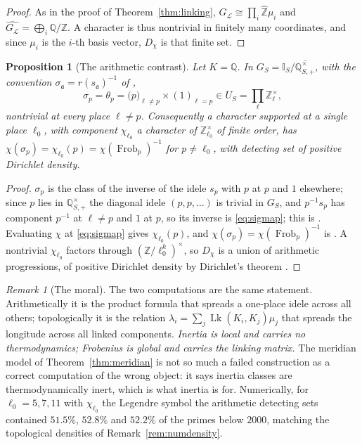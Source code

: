 \documentclass[11pt]{amsart}
\numberwithin{equation}{section}
\newtheorem{proposition}[theorem]{Proposition}
\theoremstyle{definition}
\theoremstyle{remark}
\newtheorem{remark}[theorem]{Remark}
\newcommand{\Z}{\mathbb{Z}}
\newcommand{\Q}{\mathbb{Q}}
\newcommand{\hZ}{\widehat{\Z}}
\newcommand{\cL}{\mathcal{L}}
\newcommand{\Idl}{\mathbb{I}}
\newcommand{\aaa}{\mathfrak{a}}
\newcommand{\Lk}{\operatorname{Lk}}
\newcommand{\Frob}{\operatorname{Frob}}
\begin{document}
\begin{proof}
As in the proof of Theorem~\ref{thm:linking}, $G_\cL\cong\prod_i\hZ\mu_i$ and
$\widehat{G_\cL}=\bigoplus_i\Q/\Z$. A character is thus nontrivial in finitely many
coordinates, and since $\mu_i$ is the $i$-th basis vector, $D_\chi$ is that finite set.
\end{proof}

\begin{proposition}[The arithmetic contrast]\label{prop:spread}
Let $K=\Q$. In $G_S=\Idl_S/\overline{\Q^\times_{S,+}}$, with the convention
$\sigma_\aaa=r(s_\aaa)^{-1}$ of \cite[(2.2)]{Main},
\begin{equation}\label{eq:sigmap}
\sigma_p=\theta_p=\bigl(p\bigr)_{\ell\ne p}\times(1)_{\ell=p}\in U_S=\prod_\ell\Z_\ell^\times ,
\end{equation}
nontrivial at every place $\ell\ne p$. Consequently a character supported at a single place
$\ell_0$, with component $\chi_{\ell_0}$ a character of $\Z_{\ell_0}^\times$ of finite order,
has $\chi(\sigma_p)=\chi_{\ell_0}(p)=\chi(\Frob_p)^{-1}$ for $p\ne\ell_0$, with detecting set
of positive Dirichlet density.
\end{proposition}

\begin{proof}
$\sigma_p$ is the class of the inverse of the idele $s_p$ with $p$ at $p$ and $1$ elsewhere;
since $p$ lies in $\Q^\times_{S,+}$ the diagonal idele $(p,p,\dots)$ is trivial in $G_S$, and
$p^{-1}s_p$ has component $p^{-1}$ at $\ell\ne p$ and $1$ at $p$, so its inverse is
\eqref{eq:sigmap}; this is \cite[Lem.~2.10(1)]{Main}. Evaluating $\chi$ at \eqref{eq:sigmap}
gives $\chi_{\ell_0}(p)$, and $\chi(\sigma_p)=\chi(\Frob_p)^{-1}$ is \cite[Lem.~3.8]{Main}.
A nontrivial $\chi_{\ell_0}$ factors through $(\Z/\ell_0^k)^\times$, so $D_\chi$ is a union
of arithmetic progressions, of positive Dirichlet density by Dirichlet's theorem
\cite[Ch.~VII]{Neukirch}.
\end{proof}

\begin{remark}[The moral]\label{rem:moral}
The two computations are the same statement. Arithmetically it is the product formula that
spreads a one-place idele across all others; topologically it is the relation
$\lambda_i=\sum_j\Lk(K_i,K_j)\mu_j$ that spreads the longitude across all linked components.
\emph{Inertia is local and carries no thermodynamics; Frobenius is global and carries the
linking matrix.} The meridian model of Theorem~\ref{thm:meridian} is not so much a failed
construction as a correct computation of the wrong object: it says inertia classes are
thermodynamically inert, which is what inertia is for. Numerically, for
$\ell_0=5,7,11$ with $\chi_{\ell_0}$ the Legendre symbol the arithmetic detecting sets
contained $51.5\%$, $52.8\%$ and $52.2\%$ of the primes below $2000$, matching the
topological densities of Remark~\ref{rem:numdensity}.
\end{remark}
\end{document}
